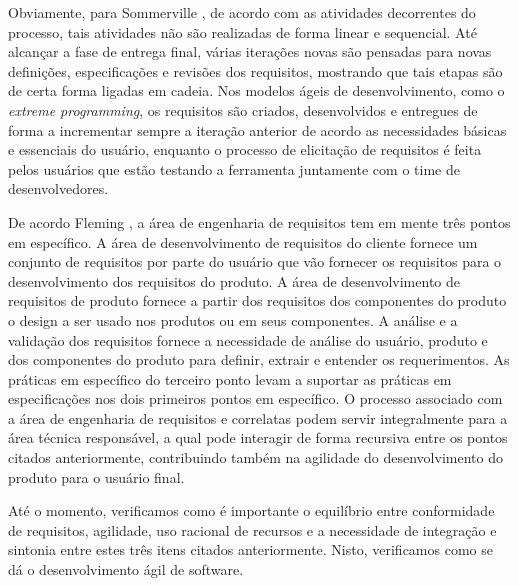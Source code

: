  Obviamente, para Sommerville \cite{Sommerville07}, de acordo com as atividades decorrentes do processo, tais atividades não são realizadas de forma linear e sequencial. Até alcançar a fase de entrega final, várias iterações novas são pensadas para novas definições, especificações e revisões dos requisitos, mostrando que tais etapas são de certa forma ligadas em cadeia. Nos modelos ágeis de desenvolvimento, como o \textit{extreme programming}, os requisitos são criados, desenvolvidos e entregues de forma a incrementar sempre a iteração anterior de acordo as necessidades básicas e essenciais do usuário, enquanto o processo de elicitação de requisitos é feita pelos usuários que estão testando a ferramenta juntamente com o time de desenvolvedores.
 
 De acordo Fleming \cite{cmmi}, a área de engenharia de requisitos tem em mente três pontos em específico. A área de desenvolvimento de requisitos do cliente fornece um conjunto de requisitos por parte do usuário que vão fornecer os requisitos para o desenvolvimento dos requisitos do produto. A área de desenvolvimento de requisitos de produto fornece a partir dos requisitos dos componentes do produto o design a ser usado nos produtos ou em seus componentes. A análise e a validação dos requisitos fornece a necessidade de análise do usuário, produto e dos componentes do produto para definir, extrair e entender os requerimentos. As práticas em específico do terceiro ponto levam a suportar as práticas em especificações nos dois primeiros pontos em específico. O processo associado com a área de engenharia de requisitos e correlatas podem servir integralmente para a área técnica responsável, a qual pode interagir de forma recursiva entre os pontos citados anteriormente, contribuindo também na agilidade do desenvolvimento do produto para o usuário final.
 
 Até o momento, verificamos como é importante o equilíbrio entre conformidade de requisitos, agilidade, uso racional de recursos e a necessidade de integração e sintonia entre estes três itens citados anteriormente. Nisto, verificamos como se dá o desenvolvimento ágil de software.
 

